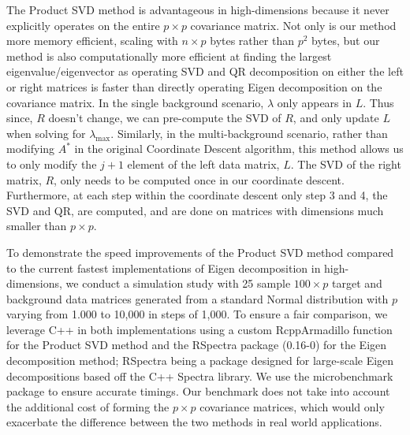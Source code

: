 \documentclass[12pt]{article}
\begin{document}
 The Product SVD method is advantageous in high-dimensions because it never explicitly operates on the entire $p \times p$ covariance matrix. Not only is our method more memory efficient, scaling with $n\times p$ bytes rather than $p^2$ bytes, but our method is also computationally more efficient at finding the largest eigenvalue/eigenvector as operating SVD and QR decomposition on either the left or right matrices is faster than directly operating Eigen decomposition on the covariance matrix. In the single background scenario,  $\lambda$ only appears in $L$. Thus since, $R$ doesn't change, we can pre-compute the SVD of $R$, and only update $L$ when solving for $\lambda_{\text{max}}$.
Similarly, in the multi-background scenario, rather than modifying $A^*$ in the original Coordinate Descent algorithm, this method allows us to only modify the $j+1$ element of the left data matrix, $L$.
 The SVD of the right matrix, $R$, only needs to be computed once in our coordinate descent. Furthermore, at each step within the coordinate descent only step 3 and 4, the SVD and QR, are computed, and are done on matrices with dimensions much smaller than $p \times p$.
 
To demonstrate the speed improvements of the Product SVD method compared to the current fastest implementations of Eigen decomposition in high-dimensions, we conduct a simulation study with 25 sample $100 \times p$ target and background data matrices generated from a standard Normal distribution with $p$ varying from 1.000 to 10,000 in steps of 1,000. To ensure a fair comparison, we leverage C++ in both implementations using a custom RcppArmadillo \cite{rcpparmadillo} function for the Product SVD method and the RSpectra package (0.16-0) \cite{Rspectra} for the Eigen decomposition method; RSpectra being a package designed for large-scale Eigen decompositions based off the C++ Spectra library. We use the microbenchmark package \cite{microbenchmark} to ensure accurate timings. Our benchmark does not take into account the additional cost of forming the $p\times p$ covariance matrices, which would only exacerbate the difference between the two methods in real world applications.
\end{document}
